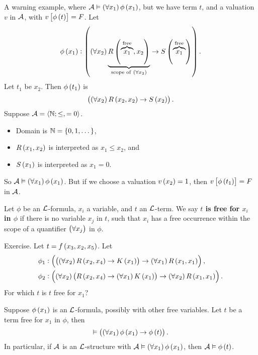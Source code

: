 \begin{example*}
A warning example, where $ \AA \vDash \fab{x_1}\phi\br{x_1} $, but we have term $ t $, and a valuation $ v $ in $ \AA $, with $ v\sbr{\phi\br{t}} = F $. Let
$$ \phi\br{x_1} : \impb{\fab{x_2}\underbrace{R\br{\overbrace{x_1}^{\text{free}}, x_2}}_{\text{scope of} \ \fab{x_2}}}{S\br{\overbrace{x_1}^{\text{free}}}}. $$
Let $ t_1 $ be $ x_2 $. Then $ \phi\br{t_1} $ is
$$ \impb{\fab{x_2}R\br{x_2, x_2}}{S\br{x_2}}. $$
Suppose $ \AA = \abr{\N; \le, = 0} $.
\begin{itemize}
\item Domain is $ \N = \cbr{0, 1, \dots} $,
\item $ R\br{x_1, x_2} $ is interpreted as $ x_1 \le x_2 $, and
\item $ S\br{x_1} $ is interpreted as $ x_1 = 0 $.
\end{itemize}
So $ \AA \vDash \fab{x_1}\phi\br{x_1} $. But if we choose a valuation $ v\br{x_2} = 1 $, then $ v\sbr{\phi\br{t_1}} = F $ in $ \AA $.
\end{example*}

\pagebreak

\begin{definition}
Let $ \phi $ be an $ \LL $-formula, $ x_i $ a variable, and $ t $ an $ \LL $-term. We say \textbf{$ t $ is free for $ x_i $ in $ \phi $} if there is no variable $ x_j $ in $ t $, such that $ x_i $ has a free occurrence within the scope of a quantifier $ \fab{x_j} $ in $ \phi $.
\end{definition}

\begin{example*}
Exercise. Let $ t = f\br{x_3, x_2, x_5} $. Let
\begin{align*}
\phi_1 & : \impb{\impb{\fab{x_2}R\br{x_2, x_4}}{K\br{x_1}}}{\fab{x_1}R\br{x_1, x_1}}, \\
\phi_2 & : \impb{\fab{x_2}\impb{R\br{x_2, x_4}}{\fab{x_1}K\br{x_1}}}{\fab{x_2}R\br{x_1, x_1}}.
\end{align*}
For which $ t $ is $ t $ free for $ x_1 $?
\end{example*}

\begin{theorem}
\label{thm:2.3.6}
Suppose $ \phi\br{x_1} $ is an $ \LL $-formula, possibly with other free variables. Let $ t $ be a term free for $ x_1 $ in $ \phi $, then
$$ \vDash \impb{\fab{x_1}\phi\br{x_1}}{\phi\br{t}}. $$
In particular, if $ \AA $ is an $ \LL $-structure with $ \AA \vDash \fab{x_1}\phi\br{x_1} $, then $ \AA \vDash \phi\br{t} $.
\end{theorem}

